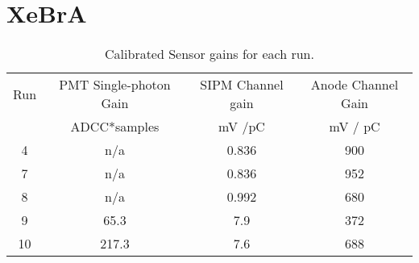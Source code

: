 \chapter{XeBrA}

\begin{table}
    \centering
    \begin{tabular}{|c|c|c|c|}
    \hline
        Run	& PMT Single-photon Gain &	SIPM Channel gain & Anode Channel Gain	 \\
         &	ADCC*samples	& 	 mV /pC	 &  mV / pC\\
        \hline
4	& n/a &		0.836  &	900\\ 
 7	& n/a &		0.836  &	952\\       
8	& n/a &		0.992&	680\\
9	&65.3&		7.9 &	372\\
10	&217.3&		7.6 &	688\\
\hline
    \end{tabular}
    \caption{Calibrated Sensor gains for each run.}
    \label{tab:gains}
\end{table}


